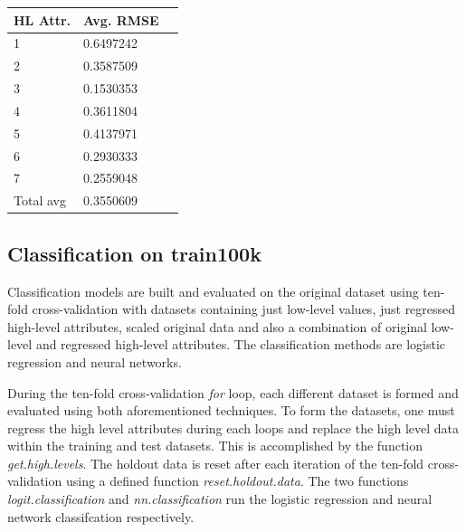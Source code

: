 \documentclass[11pt]{article}
\begin{document}
 \begin{center}   
 \begin{tabular}{@{}llr@{}}
	\toprule[1.5pt]
	HL Attr. & Avg. RMSE\\
	\toprule[1.5pt]
	1 & 0.6497242\\ \midrule
	2 & 0.3587509\\ \midrule
	3 & 0.1530353 \\ \midrule
	4 & 0.3611804\\ \midrule
	5 & 0.4137971\\ \midrule 
	6 & 0.2930333\\ \midrule
	7 & 0.2559048\\ \midrule
	Total avg & 0.3550609\\
	\bottomrule[1.25pt]
    \end{tabular}
 \label{table:t3_model_res}
 \end{center}

\subsection{Classification on train100k}
Classification models are built and evaluated on the original dataset using ten-fold cross-validation with datasets containing just low-level values, just regressed high-level attributes, scaled original data and also a combination of original low-level and regressed high-level attributes. The classification methods are logistic regression and neural networks. 

During the ten-fold cross-validation \textit{for} loop, each different dataset is formed and evaluated using both aforementioned techniques. To form the datasets, one must regress the high level attributes during each loops and replace the high level data within the training and test datasets. This is accomplished by the function \textit{get.high.levels}. The holdout data is reset after each iteration of the ten-fold cross-validation using a defined function \textit{reset.holdout.data}. The two functions \textit{logit.classification} and \textit{nn.classification} run the logistic regression and neural network classifcation respectively. 
\end{document}
